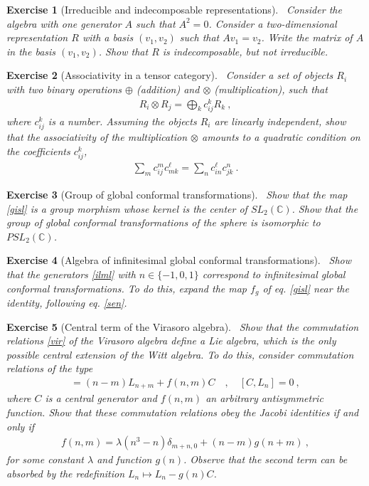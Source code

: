 \documentclass[12pt, a4paper, notitlepage, twoside]{report}
\numberwithin{equation}{section}
\theoremstyle{break}
\newtheorem{exo}{Exercise}[chapter]
\begin{document}
\begin{exo}[Irreducible and indecomposable representations] 
~\label{exoirr}
Consider the algebra with one generator $A$ such that $A^2 = 0$.
Consider a two-dimensional representation $R$ with a basis $(v_1,v_2)$ such that $Av_1=v_2$.
Write the matrix of $A$ in the basis $(v_1,v_2)$.
Show that $R$ is indecomposable, but not irreducible. 
\end{exo}

\begin{exo}[Associativity in a tensor category]
 ~\label{exoten}
Consider a set of objects $R_i$ with two binary operations $\oplus$ (addition) and $\otimes$ (multiplication), such that 
\begin{align}
 R_i \otimes R_j = \bigoplus_k c_{ij}^k R_k\ ,
\end{align}
where $c_{ij}^k$ is a number.
Assuming the objects $R_i$ are linearly independent, show that the associativity of the multiplication $\otimes$ amounts to a quadratic condition on the coefficients $c_{ij}^k$,
\begin{align}
 \sum_m c_{ij}^m c_{mk}^\ell = \sum_n c_{in}^\ell c_{jk}^n\ .
\end{align}
\end{exo}

\begin{exo}[Group of global conformal transformations]
 ~\label{exoiso}
Show that the map \eqref{gisl} is a group morphism whose kernel is the center of $SL_2({\mathbb{C}})$.
Show that the group of global conformal transformations of the sphere is isomorphic to $PSL_2({\mathbb{C}})$. 
\end{exo}

\begin{exo}[Algebra of infinitesimal global conformal transformations]
 ~\label{exomoz}
Show that the generators \eqref{ilml} with $n\in\{-1,0,1\}$ correspond to infinitesimal global conformal transformations.
To do this, expand the map $f_g$ of eq. \eqref{gisl} near the identity, following eq. \eqref{sen}.
\end{exo}


\begin{exo}[Central term of the Virasoro algebra]
~\label{exovir}
 Show that the commutation relations \eqref{vir} of the Virasoro algebra define a Lie algebra, which is the only possible central extension of the Witt algebra.
To do this, consider commutation relations of the type
\begin{align}
 [L_n,L_m] =(n-m)L_{n+m} + f(n,m) C  \quad , \quad [C,L_n]=0\ ,
\end{align}
where $C$ is a central generator and $f(n,m)$ an arbitrary antisymmetric function.
Show that these commutation relations obey the Jacobi identities if and only if 
\begin{align}
 f(n,m) = \lambda (n^3-n)\delta_{m+n,0} + (n-m)g(n+m)\ ,
\end{align}
for some constant $\lambda$ and function $g(n)$.
Observe that the second term can be absorbed by the redefinition $L_n\mapsto L_n-g(n)C$.
\end{exo}
\end{document}
